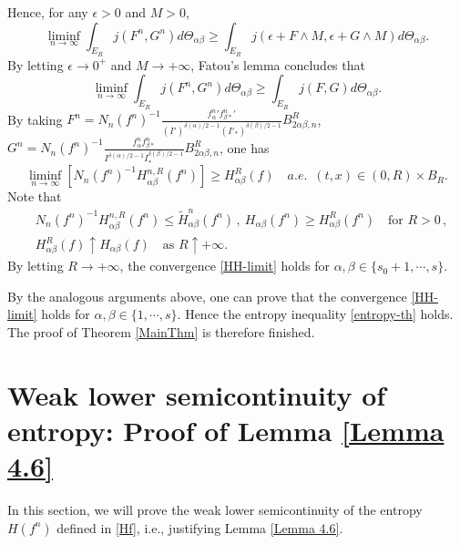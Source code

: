 \documentclass[reqno,11pt]{amsart}
\numberwithin{equation}{section}
\begin{document}
Hence, for any $\epsilon>0$ and $M > 0$,
\begin{equation*}
\liminf \limits_{n\rightarrow \infty} \int_{E_R}j(F^n,G^n)d\Theta_{\alpha \beta } \geq \int_{E_R}j(\epsilon +F\wedge M ,\epsilon +G\wedge M)d\Theta_{\alpha \beta }.
\end{equation*}
By letting $\epsilon \to 0^+$ and $M \to +\infty$, Fatou's lemma concludes that
\begin{equation}
\liminf \limits_{n\rightarrow \infty} \int_{E_R}j(F^n,G^n)d \Theta_{\alpha \beta } \geq \int_{E_R}j(F ,G) d \Theta_{\alpha \beta }.
\end{equation}
By taking $F^n= N_n (f^n)^{-1} \frac{{f_\alpha^n}' {f_{\beta *}^n}'}{(I')^{\delta(\alpha)/2-1} (I'_*)^{\delta(\beta)/2-1 }} B^R_{2 \alpha \beta, n} $, $G^n= N_n (f^n)^{-1} \frac{f_\alpha^n f_{\beta *}^n}{ I^{\delta(\alpha) /2-1} I_*^{\delta(\beta)/2-1}} B^R_{2 \alpha \beta, n} $, one has 
\begin{equation*}
\liminf \limits_{n\rightarrow \infty} [ N_n (f^n)^{-1} H^{n, R}_{\alpha \beta }(f^n) ] \geq H^R_{\alpha \beta }(f) \quad a.e. \enspace (t, x) \in (0,R) \times B_R.
\end{equation*}
Note that
\begin{equation}
\begin{aligned}
& N_n (f^n)^{-1} H^{n, R}_{\alpha \beta }(f^n) \leq \tilde{H}^n_{\alpha \beta} (f^n) \,, \ H_{\alpha \beta }(f^n)\geq H^R_{\alpha \beta }(f^n) \quad \text{for } R > 0 \,, \\
& H^R_{\alpha \beta }(f) \uparrow H_{\alpha \beta }(f) \quad \text{as } R \uparrow +\infty.
\end{aligned}
\end{equation}
By letting $R \to + \infty$, the convergence \eqref{HH-limit} holds for $\alpha, \beta \in \{ s_0 + 1, \cdots, s \}$.

By the analogous arguments above, one can prove that the convergence \eqref{HH-limit} holds for $\alpha, \beta \in \{1, \cdots, s \}$. Hence the entropy inequality \eqref{entropy-th} holds. The proof of Theorem \ref{MainThm} is therefore finished.



\section{Weak lower semicontinuity of entropy: Proof of Lemma \ref{Lemma 4.6}}\label{subsec-4.6}

In this section, we will prove the weak lower semicontinuity of the entropy $H (f^n)$ defined in \eqref{Hf}, i.e., justifying Lemma \ref{Lemma 4.6}.
\end{document}
